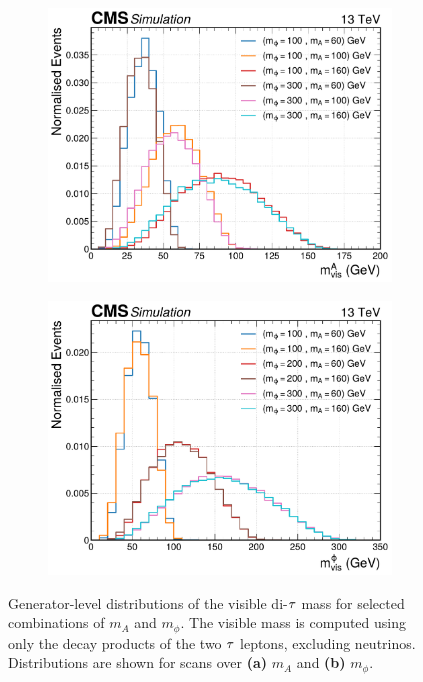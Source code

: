 \begin{figure}[!htbp]
        \centering
        \begin{subfigure}[b]{0.7\textwidth}
            \centering
            \includegraphics[width=\textwidth]{Figures/Chapter6/mvis_A.pdf}
            \caption{}
        \end{subfigure}
        \hfill
        \begin{subfigure}[b]{0.7\textwidth}
            \centering
            \includegraphics[width=\textwidth]{Figures/Chapter6/mvis_phi.pdf}
            \caption{}
        \end{subfigure}
    \caption[Generator-level visible mass distributions for different mass combinations of $\phi$ and A.]{Generator-level distributions of the visible di-$\tau$ mass for selected combinations of $m_A$ and $m_\phi$. The visible mass is computed using only the decay products of the two $\tau$ leptons, excluding neutrinos. Distributions are shown for scans over \textbf{(a)} $m_A$ and \textbf{(b)} $m_\phi$.}
    \label{Figure:Chapter6_GenVisDistributions}
\end{figure}

